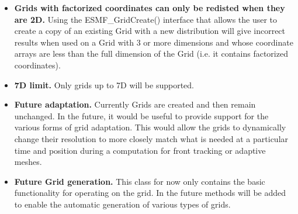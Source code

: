 

\begin{itemize}

\item {\bf Grids with factorized coordinates can only be redisted when they are 2D.}
Using the ESMF\_GridCreate() interface that allows the user to create a copy of an existing Grid with a new distribution will give incorrect results when used on a Grid with 3 or more dimensions and whose coordinate arrays are less than the full dimension of the Grid (i.e. it contains factorized coordinates).

\item {\bf 7D limit.}  Only grids up to 7D will be supported.

\item {\bf Future adaptation.}  Currently Grids
are created and then remain unchanged. In the future, it would
be useful to provide support for the various forms of grid
adaptation. This would allow the grids to dynamically change
their resolution to more closely match what is needed at a particular
time and position during a computation for front tracking or adaptive meshes.


\item {\bf Future Grid generation.} This class for now only contains
the basic functionality for operating on the grid. In the future
methods will be added to enable the automatic generation of various types of
grids. 


\end{itemize}

